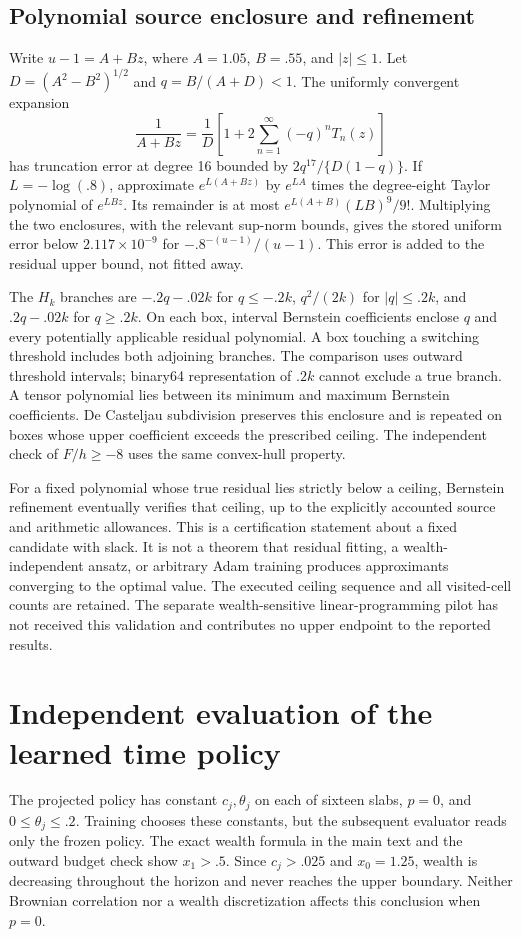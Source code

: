 \subsection{Polynomial source enclosure and refinement}
Write $u-1=A+Bz$, where $A=1.05$, $B=.55$, and $|z|\leq1$. Let $D=(A^2-B^2)^{1/2}$ and $q=B/(A+D)<1$. The uniformly convergent expansion
\[
 \frac1{A+Bz}=\frac1D\left[1+2\sum_{n=1}^{\infty}(-q)^nT_n(z)\right]
\]
has truncation error at degree 16 bounded by $2q^{17}/\{D(1-q)\}$. If $L=-\log(.8)$, approximate $e^{L(A+Bz)}$ by $e^{LA}$ times the degree-eight Taylor polynomial of $e^{LBz}$. Its remainder is at most $e^{L(A+B)}(LB)^9/9!$. Multiplying the two enclosures, with the relevant sup-norm bounds, gives the stored uniform error below $2.117\times10^{-9}$ for $-.8^{-(u-1)}/(u-1)$. This error is added to the residual upper bound, not fitted away.

The $H_k$ branches are $-.2q-.02k$ for $q\leq-.2k$, $q^2/(2k)$ for $|q|\leq.2k$, and $.2q-.02k$ for $q\geq.2k$. On each box, interval Bernstein coefficients enclose $q$ and every potentially applicable residual polynomial. A box touching a switching threshold includes both adjoining branches. The comparison uses outward threshold intervals; binary64 representation of $.2k$ cannot exclude a true branch. A tensor polynomial lies between its minimum and maximum Bernstein coefficients. De Casteljau subdivision preserves this enclosure and is repeated on boxes whose upper coefficient exceeds the prescribed ceiling. The independent check of $F/h\geq-8$ uses the same convex-hull property.

For a fixed polynomial whose true residual lies strictly below a ceiling, Bernstein refinement eventually verifies that ceiling, up to the explicitly accounted source and arithmetic allowances. This is a certification statement about a fixed candidate with slack. It is not a theorem that residual fitting, a wealth-independent ansatz, or arbitrary Adam training produces approximants converging to the optimal value. The executed ceiling sequence and all visited-cell counts are retained. The separate wealth-sensitive linear-programming pilot has not received this validation and contributes no upper endpoint to the reported results.

\section{Independent evaluation of the learned time policy}\label{r9:proof:policy}
The projected policy has constant $c_j,\theta_j$ on each of sixteen slabs, $p=0$, and $0\leq\theta_j\leq.2$. Training chooses these constants, but the subsequent evaluator reads only the frozen policy. The exact wealth formula in the main text and the outward budget check show $x_1>.5$. Since $c_j>.025$ and $x_0=1.25$, wealth is decreasing throughout the horizon and never reaches the upper boundary. Neither Brownian correlation nor a wealth discretization affects this conclusion when $p=0$.

